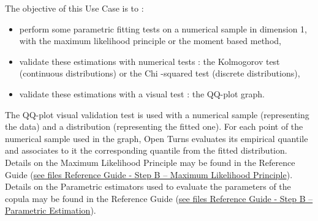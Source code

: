 \renewcommand{\filename}{docUC_InputWithData_FittingTests.tex}
\renewcommand{\filetitle}{UC : Distribution fitting tests, numerical and visual validation tests : Chi-squared test, Kolmogorov test, QQ-plot graph}

\HeaderIIILevel






The objective of this Use Case is to :
\begin{itemize}
\item perform some parametric fitting tests on a numerical sample in dimension 1, with the maximum likelihood principle or the moment based method,
\item validate these estimations with numerical tests : the Kolmogorov test (continuous distributions) or the Chi -squared test (discrete distributions),
\item validate these estimations with a visual test : the QQ-plot graph.
\end{itemize}

The QQ-plot visual validation test is used with a numerical sample (representing the data) and a distribution (representing the fitted one). For each point of the numerical sample used in the graph, Open Turns evaluates its empirical quantile and associates to it the corresponding quantile from the fitted distribution. \\

Details on the Maximum Likelihood  Principle may be found in the Reference Guide (\href{OpenTURNS_ReferenceGuide.pdf}{see files Reference Guide - Step B -- Maximum Likelihood  Principle}).\\

Details on the Parametric estimators used to evaluate the parameters of the copula may be found in the Reference Guide (\href{OpenTURNS_ReferenceGuide.pdf}{see files Reference Guide - Step B --  Parametric Estimation}).\\

